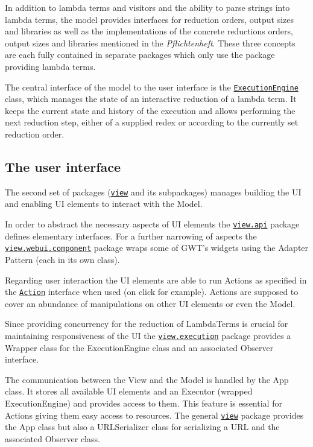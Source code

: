 \documentclass[a4paper, parskip=half]{scrartcl}
\newcommand{\pkglnk}[1]{\hyperref[pkg:edu.kit.wavelength.client.#1]{#1}}
\begin{document}
In addition to lambda terms and visitors and the ability to parse strings into
lambda terms, the model provides interfaces for reduction orders,
output sizes and libraries as well as the implementations of the concrete reductions orders,
output sizes and libraries mentioned in the \textit{Pflichtenheft}. These three
concepts are each fully contained in separate packages which only use the package
providing lambda terms.

The central interface of the model to the user interface is the
\texttt{\hyperref[type:edu.kit.wavelength.client.model.ExecutionEngine]{ExecutionEngine}}
class, which manages the state of an interactive reduction of a lambda term. It
keeps the current state and history of the execution and allows performing the next
reduction step, either of a supplied redex or according to the currently set reduction
order.

\subsection{The user interface}

The second set of packages (\texttt{\pkglnk{view}} and its subpackages) manages building the UI 
and enabling UI elements to interact with the Model.

In order to abstract the necessary aspects of UI elements the \texttt{\pkglnk{view.api}} package 
defines elementary interfaces.
For a further narrowing of aspects the \texttt{\pkglnk{view.webui.component}} package wraps some of 
GWT's widgets using the Adapter Pattern (each in its own class).

Regarding user interaction the UI elements are able to run Actions as specified in the 
\texttt{\hyperref[type:edu.kit.wavelength.client.view.action.Action]{Action}} interface when used (on click for example).
Actions are supposed to cover an abundance of manipulations on other UI elements or even the Model.

Since providing concurrency for the reduction of LambdaTerms is crucial for maintaining responsiveness of the UI 
the \texttt{\pkglnk{view.execution}} package provides a Wrapper class for the ExecutionEngine class and an associated
Observer interface.

The communication between the View and the Model is handled by the App class. It stores all available UI elements and
an Executor (wrapped ExecutionEngine) and provides access to them. This feature is essential for Actions giving them
easy access to resources.
The general \texttt{\pkglnk{view}} package provides the App class but also a URLSerializer class for serializing a URL
and the associated Observer class.
\end{document}
